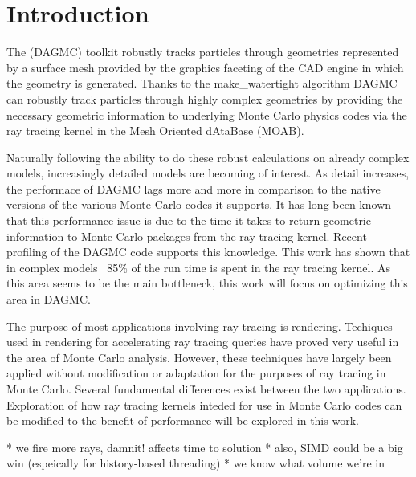 \documentclass[10pt, a4paper]{article}
\begin{document}
\section{Introduction}



The (DAGMC) toolkit \cite{dagmc_2009} robustly tracks particles through geometries represented by a surface mesh provided by the graphics faceting of the CAD engine in which the geometry is generated. Thanks to the make\_watertight algorithm\cite{make_watertight_smith_2010} DAGMC can robustly track particles through highly complex geometries by providing the necessary geometric information to underlying Monte Carlo physics codes via the ray tracing kernel in the Mesh Oriented dAtaBase (MOAB)\cite{moab}.

Naturally following the ability to do these robust calculations on already complex models, increasingly detailed models are becoming of interest. As detail increases, the performace of DAGMC lags more and more in comparison to the native versions of the various Monte Carlo codes it supports. It has long been known that this performance issue is due to the time it takes to return geometric information to Monte Carlo packages from the ray tracing kernel. Recent profiling of the DAGMC code supports this knowledge. This work has shown that in complex models ~85\% of the run time is spent in the ray tracing kernel. As this area seems to be the main bottleneck, this work will focus on optimizing this area in DAGMC.

The purpose of most applications involving ray tracing is rendering. Techiques used in rendering for accelerating ray tracing queries have proved very useful in the area of Monte Carlo analysis. However, these techniques have largely been applied without modification or adaptation for the purposes of ray tracing in Monte Carlo. Several fundamental differences exist between the two applications. Exploration of how ray tracing kernels inteded for use in Monte Carlo codes can be modified to the benefit of performance will be explored in this work.

* we fire more rays, damnit! affects time to solution
* also, SIMD could be a big win (espeically for history-based threading)
* we know what volume we're in
\end{document}
